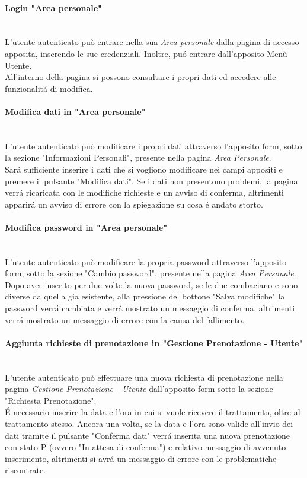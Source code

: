 \documentclass{article}
\begin{document}
\paragraph{Login "Area personale"}\mbox{}\\
L'utente autenticato può entrare nella sua \textit{Area personale} dalla pagina di accesso apposita, inserendo le sue credenziali. Inoltre, puó entrare dall'apposito Menù Utente.\\
All'interno della pagina si possono consultare i propri dati ed accedere alle funzionalitá di modifica.

\paragraph{Modifica dati in "Area personale"}\mbox{}\\
L'utente autenticato può modificare i propri dati attraverso l'apposito form, sotto la sezione "Informazioni Personali", presente nella pagina \textit{Area Personale}.\\
Sará sufficiente inserire i dati che si vogliono modificare nei campi appositi e premere il pulsante "Modifica dati". Se i dati non presentono problemi, la pagina verrá ricaricata con le modifiche richieste e un avviso di conferma, altrimenti apparirá un avviso di errore con la spiegazione su cosa é andato storto.

\paragraph{Modifica password in "Area personale"}\mbox{}\\
L'utente autenticato può modificare la propria password attraverso l'apposito form, sotto la sezione "Cambio password", presente nella pagina \textit{Area Personale}.\\
Dopo aver inserito per due volte la nuova password, se le due combaciano e sono diverse da quella gia esistente, alla pressione del bottone "Salva modifiche" la password verrá cambiata e verrá mostrato un messaggio di conferma, altrimenti verrá mostrato un messaggio di errore con la causa del fallimento.

\paragraph{Aggiunta richieste di prenotazione in "Gestione Prenotazione - Utente"}\mbox{}\\
L'utente autenticato può effettuare una nuova richiesta di prenotazione nella pagina \textit{Gestione Prenotazione - Utente} dall'apposito form sotto la sezione "Richiesta Prenotazione".\\
É necessario inserire la data e l'ora in cui si vuole ricevere il trattamento, oltre al trattamento stesso. Ancora una volta, se la data e l'ora sono valide all'invio dei dati tramite il pulsante "Conferma dati" verrá inserita una nuova prenotazione con stato P (ovvero "In attesa di conferma") e relativo messaggio di avvenuto inserimento, altrimenti si avrá un messaggio di errore con le problematiche riscontrate.
\end{document}
